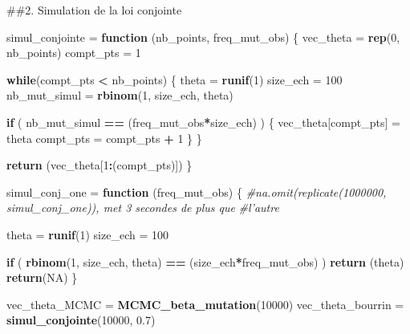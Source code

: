 \documentclass[]{article}
\newenvironment{Shaded}{\begin{snugshade}}{\end{snugshade}}
\newcommand{\CommentTok}[1]{\textcolor[rgb]{0.56,0.35,0.01}{\textit{#1}}}
\newcommand{\ControlFlowTok}[1]{\textcolor[rgb]{0.13,0.29,0.53}{\textbf{#1}}}
\newcommand{\DecValTok}[1]{\textcolor[rgb]{0.00,0.00,0.81}{#1}}
\newcommand{\FloatTok}[1]{\textcolor[rgb]{0.00,0.00,0.81}{#1}}
\newcommand{\KeywordTok}[1]{\textcolor[rgb]{0.13,0.29,0.53}{\textbf{#1}}}
\newcommand{\NormalTok}[1]{#1}
\newcommand{\OperatorTok}[1]{\textcolor[rgb]{0.81,0.36,0.00}{\textbf{#1}}}
\newcommand{\OtherTok}[1]{\textcolor[rgb]{0.56,0.35,0.01}{#1}}
\newcommand{\StringTok}[1]{\textcolor[rgb]{0.31,0.60,0.02}{#1}}
\begin{document}
\#\#2. Simulation de la loi conjointe

\begin{Shaded}
\begin{Highlighting}[]
\NormalTok{simul_conjointe =}\StringTok{ }\ControlFlowTok{function}\NormalTok{ (nb_points, freq_mut_obs)}
\NormalTok{\{}
\NormalTok{  vec_theta =}\StringTok{ }\KeywordTok{rep}\NormalTok{(}\DecValTok{0}\NormalTok{, nb_points)}
\NormalTok{  compt_pts =}\StringTok{ }\DecValTok{1}
  
  \ControlFlowTok{while}\NormalTok{(compt_pts }\OperatorTok{<}\StringTok{ }\NormalTok{nb_points)}
\NormalTok{  \{}
\NormalTok{    theta =}\StringTok{ }\KeywordTok{runif}\NormalTok{(}\DecValTok{1}\NormalTok{)}
\NormalTok{    size_ech =}\StringTok{ }\DecValTok{100}
\NormalTok{    nb_mut_simul =}\StringTok{ }\KeywordTok{rbinom}\NormalTok{(}\DecValTok{1}\NormalTok{, size_ech, theta)}
    
    \ControlFlowTok{if}\NormalTok{ ( nb_mut_simul }\OperatorTok{==}\StringTok{ }\NormalTok{(freq_mut_obs}\OperatorTok{*}\NormalTok{size_ech) )}
\NormalTok{    \{}
\NormalTok{      vec_theta[compt_pts] =}\StringTok{ }\NormalTok{theta}
\NormalTok{      compt_pts =}\StringTok{ }\NormalTok{compt_pts }\OperatorTok{+}\StringTok{ }\DecValTok{1}
\NormalTok{    \}}
\NormalTok{  \}}
  
  \KeywordTok{return}\NormalTok{ (vec_theta[}\DecValTok{1}\OperatorTok{:}\NormalTok{(compt_pts)])}
\NormalTok{\}}

\NormalTok{simul_conj_one =}\StringTok{ }\ControlFlowTok{function}\NormalTok{ (freq_mut_obs)}
\NormalTok{\{}
  \CommentTok{#na.omit(replicate(1000000, simul_conj_one)), met 3 secondes de plus que}
  \CommentTok{#l'autre}
  
\NormalTok{  theta =}\StringTok{ }\KeywordTok{runif}\NormalTok{(}\DecValTok{1}\NormalTok{)}
\NormalTok{  size_ech =}\StringTok{ }\DecValTok{100}
  
  \ControlFlowTok{if}\NormalTok{ ( }\KeywordTok{rbinom}\NormalTok{(}\DecValTok{1}\NormalTok{, size_ech, theta) }\OperatorTok{==}\StringTok{ }\NormalTok{(size_ech}\OperatorTok{*}\NormalTok{freq_mut_obs) )}
    \KeywordTok{return}\NormalTok{ (theta)}
  \KeywordTok{return}\NormalTok{(}\OtherTok{NA}\NormalTok{)}
\NormalTok{\}}
\end{Highlighting}
\end{Shaded}

\begin{Shaded}
\begin{Highlighting}[]
\NormalTok{vec_theta_MCMC =}\StringTok{ }\KeywordTok{MCMC_beta_mutation}\NormalTok{(}\DecValTok{10000}\NormalTok{)}
\NormalTok{vec_theta_bourrin =}\StringTok{ }\KeywordTok{simul_conjointe}\NormalTok{(}\DecValTok{10000}\NormalTok{, }\FloatTok{0.7}\NormalTok{)}
\end{Highlighting}
\end{Shaded}
\end{document}
